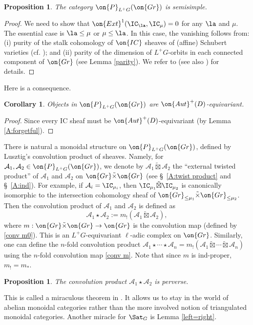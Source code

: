 \documentclass[]{pcmi}
\theoremstyle{plain}
\newtheorem{prop}[equation]{Proposition}
\newtheorem{cor}[equation]{Corollary}
\theoremstyle{remark}
\theoremstyle{definition}
\newcommand{\mA}{{\mathcal A}}
\newcommand{\Aut}{{\on{Aut}}}
\newcommand{\Gr}{{\on{Gr}}}
\begin{document}
\begin{prop}\label{semisimplicity}
The category $\on{P}_{L^+G}(\Gr)$ is semisimple.
\end{prop}
\begin{proof}We need to show that $\on{Ext}^1(\IC_\la,\IC_\mu)=0$ for any $\la$ and $\mu$. The essential case is $\la\leq \mu$ or $\mu\leq \la$. In this case, the vanishing follows from: (i) purity of the stalk cohomology of $\on{IC}$ sheaves of (affine) Schubert varieties (cf. \cite{KL}); and (ii) parity of the dimension of $L^+G$-orbits in each connected component of $\Gr$ (see Lemma \ref{parity}). We refer to \cite[Proposition 1]{Ga} (see also \cite[Proposition 3.1]{Ri}) for details. 
\end{proof}

Here is a consequence.
\begin{cor}
Objects in $\on{P}_{L^+G}(\Gr)$ are $\Aut^+(D)$-equivariant.
\end{cor}
\begin{proof}Since every IC sheaf must be $\Aut^+(D)$-equivariant (by Lemma \ref{A:forgetful}).
\end{proof}

There is natural a monoidal structure on $\on{P}_{L^+G}(\Gr)$, defined by Lusztig's convolution product of sheaves. Namely, for $\mA_1,\mA_2\in \on{P}_{L^+G}(\Gr)$, we denote by $\mA_1\tilde\boxtimes\mA_2$ the ``external twisted product'' of $\mA_1$ and $\mA_2$ on $\Gr\tilde\times\Gr$ (see \S~\ref{A:twist product} and  \S~\ref{A:ind}). For example, if $\mA_i=\IC_{\mu_i}$, then $\IC_{\mu_1}\tilde\boxtimes\IC_{\mu_2}$ is canonically isomorphic to the intersection cohomology sheaf of $\Gr_{\leq \mu_1}\tilde\times\Gr_{\leq\mu_2}$.
Then the convolution product of $\mA_1$ and $\mA_2$ is defined as
\begin{equation}\label{Lus conv}
\mA_1\star\mA_2:=m_!(\mA_1\tilde\boxtimes\mA_2),
\end{equation}
where $m:\Gr\tilde\times\Gr\to \Gr$ is the convolution map (defined by \eqref{conv m0}).
This is an $L^+G$-equivariant $\ell$-adic complex on $\Gr$. Similarly, one can define the $n$-fold convolution product $\mA_1\star\cdots\star\mA_n=m_!(\mA_1\tilde\boxtimes\cdots\tilde\boxtimes\mA_n)$ using the $n$-fold convolution map \eqref{conv m}. Note that since $m$ is ind-proper, $m_!=m_*$.

\begin{prop}\label{conv prod}
The convolution product $\mA_1\star\mA_2$ is perverse.
\end{prop}
This is called a miraculous theorem in \cite{BD}. It allows us to stay in the world of abelian monoidal categories rather than the more involved notion of triangulated monoidal categories. Another miracle for $\Sat_G$ is Lemma \ref{left=right}.
\end{document}
